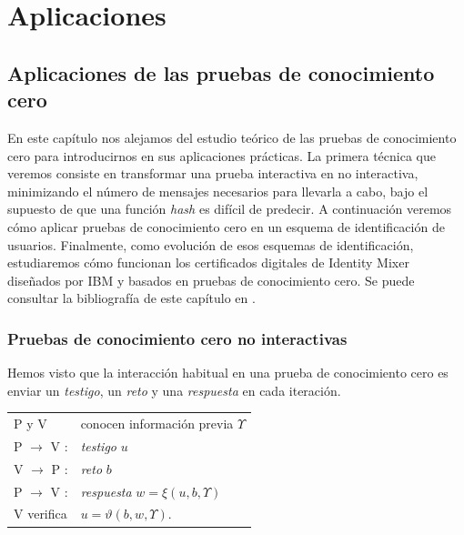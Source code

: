 \part{Aplicaciones}


\chapter{Aplicaciones de las pruebas de conocimiento cero}\label{ch:aplicaciones} 


En este capítulo nos alejamos del estudio teórico de las pruebas de conocimiento cero para introducirnos en sus aplicaciones prácticas. La primera técnica que veremos consiste en transformar una prueba interactiva en no interactiva, minimizando el número de mensajes necesarios para llevarla a cabo, bajo el supuesto de que una función \textit{hash} es difícil de predecir. A continuación veremos cómo aplicar pruebas de conocimiento cero en un esquema de identificación de usuarios. Finalmente, como evolución de esos esquemas de identificación, estudiaremos cómo funcionan los certificados digitales de Identity Mixer diseñados por IBM y basados en pruebas de conocimiento cero. Se puede consultar la bibliografía de este capítulo en \citep{menezes1996handbook,stinson2005cryptography,idemixSpec}.



\section{Pruebas de conocimiento cero no interactivas}

Hemos visto que la interacción habitual en una prueba de conocimiento cero es enviar un \textit{testigo}, un \textit{reto} y una \textit{respuesta} en cada iteración.

\begin{center}
	\begin{tabular}{ll}
		P y V & conocen información previa $\Upsilon$
		\\
		P $\rightarrow$ V :& \textit{testigo} $u$
		\\
		V $\rightarrow$ P :& \textit{reto} $b$
		\\
		P $\rightarrow$ V :& \textit{respuesta} $w = \xi(u,b,\Upsilon)$
		\\
		V verifica & $u=\vartheta(b,w,\Upsilon)$.
	\end{tabular}
\end{center}

